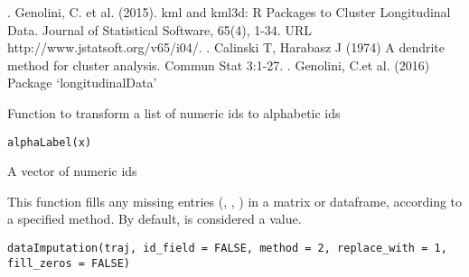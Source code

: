 \documentclass[a4paper]{book}
\begin{document}
%
\begin{References}\relax
{}. Genolini, C. et al. (2015). kml and kml3d: R Packages to Cluster Longitudinal Data. Journal of Statistical Software, 65(4), 1-34. URL http://www.jstatsoft.org/v65/i04/.
. Calinski T, Harabasz J (1974) A dendrite method for cluster analysis. Commun Stat 3:1-27.
. Genolini, C.et al. (2016) Package ‘longitudinalData’
\end{References}
%
\begin{Examples}
\end{Examples}
%
\begin{Description}\relax
Function to transform a list of numeric ids to alphabetic ids
\end{Description}
%
\begin{Usage}
\begin{verbatim}
alphaLabel(x)
\end{verbatim}
\end{Usage}
%
\begin{Arguments}
\begin{ldescription}
\item[\code{x}] A vector of numeric ids
\end{ldescription}
\end{Arguments}
%
\begin{Description}\relax
This function fills any missing entries (, , ) in a matrix or dataframe, according to a specified method. By default,  is considered a value.
\end{Description}
%
\begin{Usage}
\begin{verbatim}
dataImputation(traj, id_field = FALSE, method = 2, replace_with = 1, fill_zeros = FALSE)
\end{verbatim}
\end{Usage}
%
\end{document}
